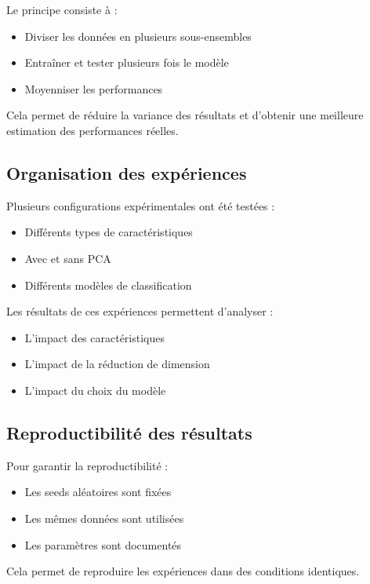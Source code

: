 \documentclass[12pt,a4paper]{article}
\begin{document}
    Le principe consiste à :
    \begin{itemize}
        \item Diviser les données en plusieurs sous-ensembles
        \item Entraîner et tester plusieurs fois le modèle
        \item Moyenniser les performances
    \end{itemize}

    Cela permet de réduire la variance des résultats et d’obtenir une meilleure estimation des performances réelles.

    \subsection{Organisation des expériences}

    Plusieurs configurations expérimentales ont été testées :
    \begin{itemize}
        \item Différents types de caractéristiques
        \item Avec et sans PCA
        \item Différents modèles de classification
    \end{itemize}

    Les résultats de ces expériences permettent d’analyser :
    \begin{itemize}
        \item L’impact des caractéristiques
        \item L’impact de la réduction de dimension
        \item L’impact du choix du modèle
    \end{itemize}

    \subsection{Reproductibilité des résultats}

    Pour garantir la reproductibilité :
    \begin{itemize}
        \item Les seeds aléatoires sont fixées
        \item Les mêmes données sont utilisées
        \item Les paramètres sont documentés
    \end{itemize}

    Cela permet de reproduire les expériences dans des conditions identiques.
\end{document}
